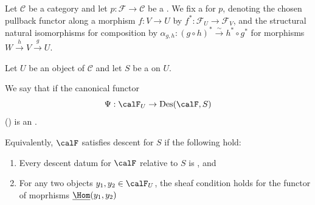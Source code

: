 \begin{definition} \label{definition:has_descent_for_a_category_fibered_in_groupoids_over_a_category_and_a_sieve_on_an_object_on_the_base_category}
Let $\mathcal{C}$ be a category and let $p: \mathcal{F} \to \mathcal{C}$ be a . We fix a  for $p$, denoting the chosen pullback functor along a morphism $f: V \to U$ by $f^*: \mathcal{F}_U \to \mathcal{F}_V$, and the structural natural isomorphisms for composition by $\alpha_{g,h}: (g \circ h)^* \xrightarrow{\sim} h^* \circ g^*$ for morphisms $W \xrightarrow{h} V \xrightarrow{g} U$.

Let $U$ be an object of $\mathcal{C}$ and let $S$ be a  on $U$.

We say that  if the canonical functor
$$\Psi: \calF_U \to \operatorname{Des}(\calF, S)$$
()
is an .

Equivalently, $\calF$ satisfies descent for $S$ if the following hold:
\begin{enumerate}
    \item Every descent datum for $\calF$ relative to $S$ is , and 
    \item For any two objects $y_1,y_2 \in \calF_U$, the sheaf condition holds for the functor of moprhisms $\underline{\Hom}(y_1,y_2)$ 
\end{enumerate}
\end{definition}